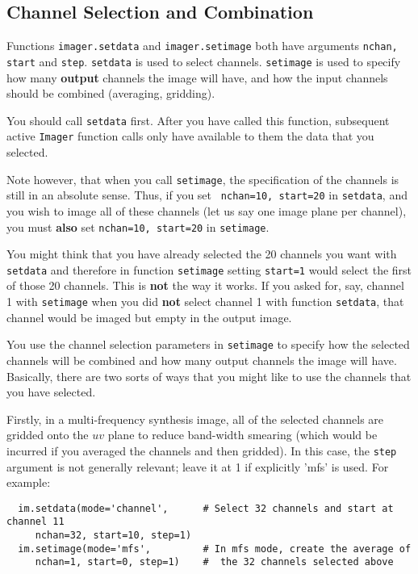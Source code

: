 \subsection{Channel Selection and Combination}
\label{section:imtool.setdata.setchans}

Functions {\tt imager.setdata} and {\tt imager.setimage} both have
arguments {\tt nchan, start} and {\tt step}.  {\tt setdata} is used to
select channels.  {\tt setimage} is used to specify how many {\bf
output} channels the image will have, and how the input channels
should be combined (averaging, gridding).

You should call {\tt setdata} first.  After you have called this
function, subsequent active {\tt Imager} function calls only have
available to them the data that you selected.

Note however, that when you call {\tt setimage}, the specification of
the channels is still in an absolute sense.  Thus, if you set {\tt
nchan=10, start=20} in {\tt setdata}, and you wish to image all of
these channels (let us say one image plane per channel), you must {\bf
also} set {\tt nchan=10, start=20} in {\tt setimage}.

You might think that you have already selected the 20 channels you
want with {\tt setdata} and therefore in function {\tt setimage}
setting {\tt start=1} would select the first of those 20 channels.
This is {\bf not} the way it works.  If you asked for, say, channel 1
with {\tt setimage} when you did {\bf not} select channel 1 with
function {\tt setdata}, that channel would be imaged but empty in the
output image.

You use the channel selection parameters in {\tt setimage} to
specify how the selected channels will be combined and how many output
channels the image will have.  Basically, there are two sorts of ways
that you might like to use the channels that you have selected.

Firstly, in a multi-frequency synthesis image, all of the selected
channels are gridded onto the $uv$ plane to reduce band-width smearing
(which would be incurred if you averaged the channels and then
gridded).  In this case, the {\tt step} argument is not generally
relevant; leave it at 1 if explicitly 'mfs' is used.  For example:

\small
\begin{verbatim}
  im.setdata(mode='channel',      # Select 32 channels and start at channel 11
     nchan=32, start=10, step=1)
  im.setimage(mode='mfs',         # In mfs mode, create the average of
     nchan=1, start=0, step=1)    #  the 32 channels selected above
\end{verbatim}
\normalsize


